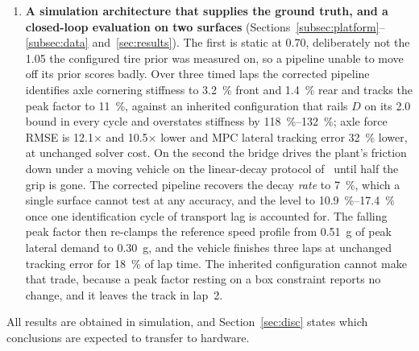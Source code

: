 \begin{enumerate}
\item \textbf{A simulation architecture that supplies the ground truth, and a
closed-loop evaluation on two surfaces}
(Sections~\ref{subsec:platform}--\ref{subsec:data} and~\ref{sec:results}). The
first is static at \num{0.70}, deliberately not the \num{1.05} the configured
tire prior was measured on, so a pipeline unable to move off its prior scores
badly. Over three timed laps the corrected pipeline identifies axle cornering
stiffness to \SI{3.2}{\percent} front and \SI{1.4}{\percent} rear and tracks
the peak factor to \SI{11}{\percent}, against an inherited configuration that
rails $D$ on its \num{2.0} bound in every cycle and overstates stiffness by
\SIrange{118}{132}{\percent}; axle force RMSE is \num{12.1}$\times$ and
\num{10.5}$\times$ lower and MPC lateral tracking error \SI{32}{\percent}
lower, at unchanged solver cost. On the second the bridge drives the plant's
friction down under a moving vehicle on the linear-decay protocol
of~\cite{llampc2025} until half the grip is gone. The corrected pipeline
recovers the decay \emph{rate} to \SI{7}{\percent}, which a single surface
cannot test at any accuracy, and the level to
\SIrange{10.9}{17.4}{\percent} once one identification cycle of transport lag is
accounted for. The falling peak factor then re-clamps the reference speed
profile from \SI{0.51}{\g} of peak lateral demand to \SI{0.30}{\g}, and the
vehicle finishes three laps at unchanged tracking error for \SI{18}{\percent}
of lap time. The inherited configuration cannot make that trade, because a peak
factor resting on a box constraint reports no change, and it leaves the track in
lap~2.
\end{enumerate}

All results are obtained in simulation, and Section~\ref{sec:disc} states which
conclusions are expected to transfer to hardware.
